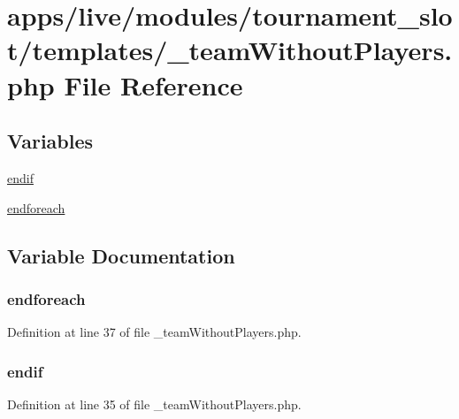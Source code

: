 \hypertarget{live_2modules_2tournament__slot_2templates_2__team_without_players_8php}{\section{apps/live/modules/tournament\-\_\-slot/templates/\-\_\-team\-Without\-Players.php File Reference}
\label{live_2modules_2tournament__slot_2templates_2__team_without_players_8php}
}
\subsection*{Variables}
\begin{DoxyCompactItemize}
\item 
\hyperlink{live_2modules_2tournament__slot_2templates_2__team_without_players_8php_a82cd33ca97ff99f2fcc5e9c81d65251b}{endif}
\item 
\hyperlink{live_2modules_2tournament__slot_2templates_2__team_without_players_8php_a672d9707ef91db026c210f98cc601123}{endforeach}
\end{DoxyCompactItemize}


\subsection{Variable Documentation}
\hypertarget{live_2modules_2tournament__slot_2templates_2__team_without_players_8php_a672d9707ef91db026c210f98cc601123}{
\subsubsection[{endforeach}]{\setlength{\rightskip}{0pt plus 5cm}endforeach}}\label{live_2modules_2tournament__slot_2templates_2__team_without_players_8php_a672d9707ef91db026c210f98cc601123}


Definition at line 37 of file \-\_\-team\-Without\-Players.\-php.

\hypertarget{live_2modules_2tournament__slot_2templates_2__team_without_players_8php_a82cd33ca97ff99f2fcc5e9c81d65251b}{
\subsubsection[{endif}]{\setlength{\rightskip}{0pt plus 5cm}endif}}\label{live_2modules_2tournament__slot_2templates_2__team_without_players_8php_a82cd33ca97ff99f2fcc5e9c81d65251b}


Definition at line 35 of file \-\_\-team\-Without\-Players.\-php.

